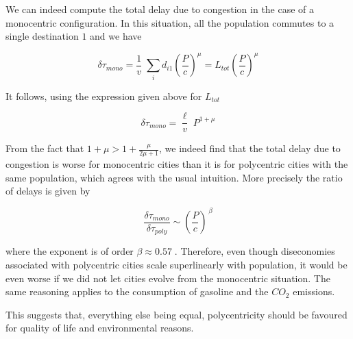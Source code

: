 We can indeed compute the total delay due to congestion in the case of a
monocentric configuration. In this situation, all the population commutes to a
single destination $1$ and we have

\begin{equation}
    \delta \tau_{mono} = \frac{1}{v}\; \sum_i d_{i1} \left(\frac{P}{c} \right)^\mu = L_{tot} \left(\frac{P}{c} \right)^\mu
\end{equation}

It follows, using the expression given above for $L_{tot}$

\begin{equation}
    \delta\tau_{mono} = \frac{\ell}{v}\; P^{1+\mu}
\end{equation}

From the fact that $1+\mu > 1+\frac{\mu}{2\mu+1}$, we indeed find that the total
delay due to congestion is worse for monocentric cities than it is for
polycentric cities with the same population, which agrees with the usual
intuition. More precisely the ratio of delays is given by

\begin{equation}
    \frac{\delta\tau_{mono}}{\delta\tau_{poly}}\sim
    \left(\frac{P}{c}\right)^{\,\beta}
\end{equation}

where the exponent is of order $\beta \approx 0.57\;$. Therefore, even though
diseconomies associated with polycentric cities scale superlinearly with
population, it would be even worse if we did not let cities evolve from the
monocentric situation. The same reasoning applies to the consumption of gasoline and
the $CO_2$ emissions. 

This suggests that, everything else being equal,
polycentricity should be favoured for quality of life and environmental reasons.

